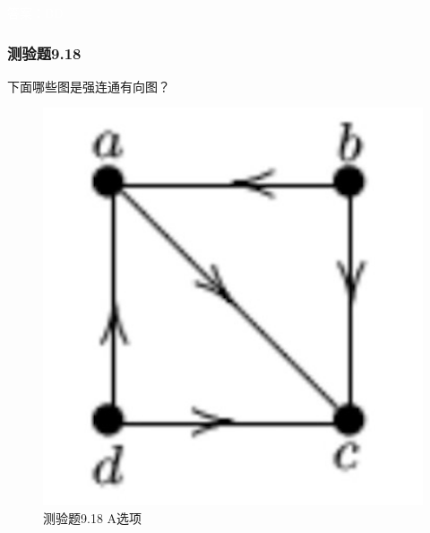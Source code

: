 \documentclass[UTF8, heading=true]{ctexart}
\begin{document}
\textcolor{white}{答案：BD}

\subsubsection{测验题9.18}

下面哪些图是强连通有向图？

\begin{figure}[H]
  \centering
  \begin{minipage}[t]{0.22\textwidth}
      \centering
      \includegraphics[width=1\textwidth]{9.17_1.jpg} %
      \vspace{-0.3cm}
      \caption{测验题9.18 A选项}
  \end{minipage}
  \hspace{0.18\textwidth} %
  \begin{minipage}[t]{0.2\textwidth}
      \centering

\end{minipage}
\end{figure}
\end{document}
